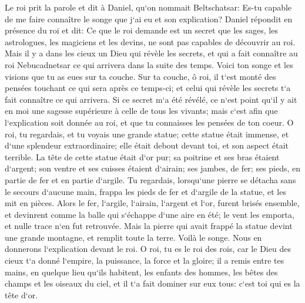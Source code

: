 \verse Le roi prit la parole et dit à Daniel, qu`on nommait Beltschatsar: Es-tu capable de me faire connaître le songe que j`ai eu et son explication? 
\verse Daniel répondit en présence du roi et dit: Ce que le roi demande est un secret que les sages, les astrologues, les magiciens et les devins, ne sont pas capables de découvrir au roi. 
\verse Mais il y a dans les cieux un Dieu qui révèle les secrets, et qui a fait connaître au roi Nebucadnetsar ce qui arrivera dans la suite des temps. Voici ton songe et les visions que tu as eues sur ta couche. 
\verse Sur ta couche, ô roi, il t`est monté des pensées touchant ce qui sera après ce temps-ci; et celui qui révèle les secrets t`a fait connaître ce qui arrivera. 
\verse Si ce secret m`a été révélé, ce n`est point qu`il y ait en moi une sagesse supérieure à celle de tous les vivants; mais c`est afin que l`explication soit donnée au roi, et que tu connaisses les pensées de ton coeur. 
\verse O roi, tu regardais, et tu voyais une grande statue; cette statue était immense, et d`une splendeur extraordinaire; elle était debout devant toi, et son aspect était terrible. 
\verse La tête de cette statue était d`or pur; sa poitrine et ses bras étaient d`argent; son ventre et ses cuisses étaient d`airain; 
\verse ses jambes, de fer; ses pieds, en partie de fer et en partie d`argile. 
\verse Tu regardais, lorsqu`une pierre se détacha sans le secours d`aucune main, frappa les pieds de fer et d`argile de la statue, et les mit en pièces. 
\verse Alors le fer, l`argile, l`airain, l`argent et l`or, furent brisés ensemble, et devinrent comme la balle qui s`échappe d`une aire en été; le vent les emporta, et nulle trace n`en fut retrouvée. Mais la pierre qui avait frappé la statue devint une grande montagne, et remplit toute la terre. 
\verse Voilà le songe. Nous en donnerons l`explication devant le roi. 
\verse O roi, tu es le roi des rois, car le Dieu des cieux t`a donné l`empire, la puissance, la force et la gloire; 
\verse il a remis entre tes mains, en quelque lieu qu`ils habitent, les enfants des hommes, les bêtes des champs et les oiseaux du ciel, et il t`a fait dominer sur eux tous: c`est toi qui es la tête d`or. 
